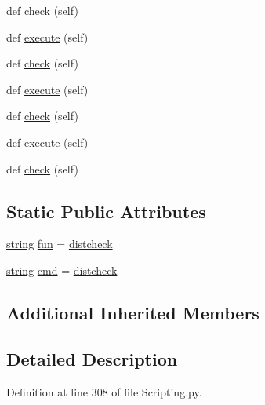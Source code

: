 \begin{DoxyCompactItemize}
def \hyperlink{classwaflib_1_1_scripting_1_1_dist_check_a5c7d7e7e99c2634c0792bb99a4f2ba7d}{check} (self)
\item 
def \hyperlink{classwaflib_1_1_scripting_1_1_dist_check_a9ec9b4a7944fbc0bef5ed200a6c67a32}{execute} (self)
\item 
def \hyperlink{classwaflib_1_1_scripting_1_1_dist_check_a5c7d7e7e99c2634c0792bb99a4f2ba7d}{check} (self)
\item 
def \hyperlink{classwaflib_1_1_scripting_1_1_dist_check_a9ec9b4a7944fbc0bef5ed200a6c67a32}{execute} (self)
\item 
def \hyperlink{classwaflib_1_1_scripting_1_1_dist_check_a5c7d7e7e99c2634c0792bb99a4f2ba7d}{check} (self)
\item 
def \hyperlink{classwaflib_1_1_scripting_1_1_dist_check_a9ec9b4a7944fbc0bef5ed200a6c67a32}{execute} (self)
\item 
def \hyperlink{classwaflib_1_1_scripting_1_1_dist_check_a5c7d7e7e99c2634c0792bb99a4f2ba7d}{check} (self)
\end{DoxyCompactItemize}
\subsection*{Static Public Attributes}
\begin{DoxyCompactItemize}
\item 
\hyperlink{test__lib_f_l_a_c_2format_8c_ab02026ad0de9fb6c1b4233deb0a00c75}{string} \hyperlink{classwaflib_1_1_scripting_1_1_dist_check_a1043d3c89238e55a83c753a178868461}{fun} = \textquotesingle{}\hyperlink{namespacewaflib_1_1_scripting_a65ff0b2233e65e673523cde5ff874633}{distcheck}\textquotesingle{}
\item 
\hyperlink{test__lib_f_l_a_c_2format_8c_ab02026ad0de9fb6c1b4233deb0a00c75}{string} \hyperlink{classwaflib_1_1_scripting_1_1_dist_check_a20de36ede7ae25c3133f812b9d6ab710}{cmd} = \textquotesingle{}\hyperlink{namespacewaflib_1_1_scripting_a65ff0b2233e65e673523cde5ff874633}{distcheck}\textquotesingle{}
\end{DoxyCompactItemize}
\subsection*{Additional Inherited Members}


\subsection{Detailed Description}


Definition at line 308 of file Scripting.\+py.



